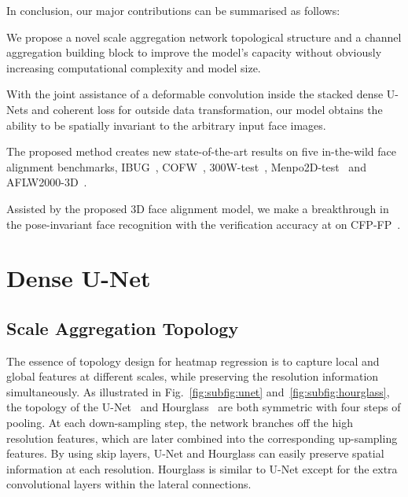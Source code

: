 \documentclass{bmvc2k}
\newenvironment{tight_itemize}{
\begin{itemize}[leftmargin=20pt]
  \setlength{\topsep}{0pt}
  \setlength{\itemsep}{0pt}
  \setlength{\parskip}{0pt}
  \setlength{\parsep}{0pt}
}{\end{itemize}}
\begin{document}
In conclusion, our major contributions can be summarised as follows:
\vspace{-0.2cm}
\begin{tight_itemize}
\item We propose a novel scale aggregation network topological structure and a channel aggregation building block to improve the model's capacity without obviously increasing computational complexity and model size.
\item With the joint assistance of a deformable convolution inside the stacked dense U-Nets and coherent loss for outside data transformation, our model obtains the ability to be spatially invariant to the arbitrary input face images. 
\item The proposed method creates new state-of-the-art results on five in-the-wild face alignment benchmarks, IBUG~\cite{sagonas2016300}, COFW~\cite{burgos2013robust,ghiasi2015occlusion}, 300W-test~\cite{sagonas2016300}, Menpo2D-test~\cite{stefanos2017menpo} and AFLW2000-3D~\cite{zhu2016face}.
\item Assisted by the proposed 3D face alignment model, we make a breakthrough in the pose-invariant face recognition with the verification accuracy at  on CFP-FP~\cite{sengupta2016frontal}.
\end{tight_itemize}

\section{Dense U-Net}



\subsection{Scale Aggregation Topology}

The essence of topology design for heatmap regression is to capture local and global features at different scales, while preserving the resolution information simultaneously. As illustrated in Fig.~\ref{fig:subfig:unet} and~\ref{fig:subfig:hourglass}, the topology of the U-Net~\cite{ronneberger2015u} and Hourglass~\cite{newell2016stacked} are both symmetric with four steps of pooling. At each down-sampling step, the network branches off the high resolution features, which are later combined into the corresponding up-sampling features. By using skip layers, U-Net and Hourglass can easily preserve spatial information at each resolution. Hourglass is similar to U-Net except for the extra convolutional layers within the lateral connections.
\end{document}
